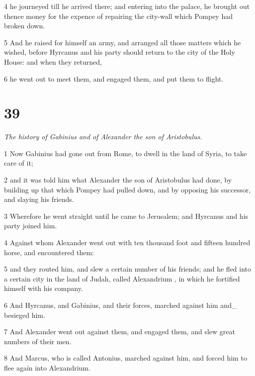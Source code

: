 \par 4 he journeyed till he arrived there; and entering into the palace, he brought out thence money for the expence of repairing the city-wall which Pompey had broken down. 

\par 5 And he raised for himself an army, and arranged all those matters which he wished, before Hyrcanus and his party should return to the city of the Holy House: and when they returned, 

\par 6 he went out to meet them, and engaged them, and put them to flight. 


\chapter{39}

\par \textit{The history of Gabinius and of Alexander the son of Aristobulus.}

\par 1 Now Gabinius had gone out from Rome, to dwell in the land of Syria, to take care of it; 

\par 2 and it was told him what Alexander the son of Aristobulus had done, by building up that which Pompey had pulled down, and by opposing his successor, and slaying his friends. 

\par 3 Wherefore he went straight until he came to Jerusalem; and Hyrcanus and his party joined him. 

\par 4 Against whom Alexander went out with ten thousand foot and fifteen hundred horse, and encountered them: 

\par 5 and they routed him, and slew a certain number of his friends; and he fled into a certain city in the land of Judah, called Alexandrium , in which he fortified himself with his company. 

\par 6 And Hyrcanus, and Gabinius, and their forces, marched against him and_ besieged him. 

\par 7 And Alexander went out against them, and engaged them, and slew great numbers of their men. 

\par 8 And Marcus, who is called Antonius, marched against him, and forced him to flee again into Alexandrium.


